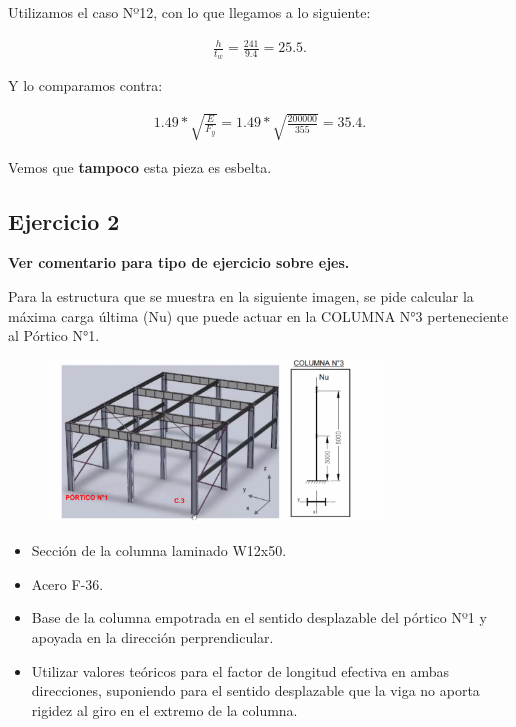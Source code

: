 \documentclass[../main.tex]{subfiles}
\begin{document}
Utilizamos el caso Nº12, con lo que llegamos a lo siguiente:

\begin{align*}
  \frac{h}{t_w} = \frac{241}{9.4} = 25.5
.\end{align*}

Y lo comparamos contra:

\begin{align*}
  1.49 * \sqrt{\frac{E}{F_y}} = 1.49 * \sqrt{\frac{200000}{355}} = 35.4
.\end{align*}

Vemos que \textbf{tampoco} esta pieza es esbelta.


\subsection{Ejercicio 2}
\textbf{Ver comentario para tipo de ejercicio sobre ejes.}

Para la estructura que se muestra en la siguiente imagen, se pide calcular la 
máxima carga última (Nu) que puede actuar en la COLUMNA N°3 perteneciente al Pórtico N°1. 

\begin{figure}[ht]
  \centering
  \includegraphics[width=0.8\textwidth]{../images/20210419/ej2}
  \label{fig:ej2}
\end{figure}

\begin{itemize}
  \item Sección de la columna laminado W12x50.
  \item Acero F-36.
  \item Base de la columna empotrada en el sentido desplazable del pórtico Nº1 y
    apoyada en la dirección perprendicular.
  \item Utilizar valores teóricos para el factor de longitud efectiva en ambas 
    direcciones, suponiendo para el sentido desplazable que la viga no aporta
    rigidez al giro en el extremo de la columna.
\end{itemize}
\end{document}
